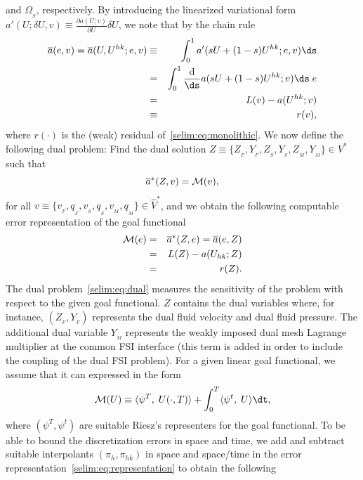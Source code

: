 and $\Omega_{_{S}}$, respectively. By introducing the linearized
variational form $a'(U; \delta U,v ) \equiv \frac{\partial
  a(U;v)}{\partial U}\delta U$, we note that by the chain rule
\begin{eqnarray}
\overline{a}(e, v) = \overline{a}(U,U^{hk};e, v) &\equiv& \int_0^1 a'(sU + (1-s)U^{hk}; e,
v) \ds \\ &=& \int_0^1 \frac{\textrm{d}}{\ds} a (sU + (1-s)U^{hk}; v)
\ds \;e\\ &=& L(v) - a(U^{hk};v) \\ &\equiv&  r(v),
\end{eqnarray}
where $r(\cdot)$ is the (weak) residual of~\ref{selim:eq:monolithic}.
We now define the following dual problem: Find the dual solution
$Z\equiv \{ Z_{_{F}}, Y_{_{F}}, Z_{_{S}}, Y_{_{S}}, Z_{_{M}},
Y_{_{M}}\}\in V^*$ such that
\begin{equation}
  \label{selim:eq:dual}
  \overline{a}^{*}(Z, v) = \mathcal{M}(v),
\end{equation}
for all $v\equiv \{ v_{_{F}}, q_{_{F}}, v_{_{S}}, q_{_{S}}, v_{_{M}}, q_{_{M}}
\}\in\hat{V}^*$, and we obtain the following computable error
representation of the goal functional
\begin{eqnarray}
\label{selim:eq:representation}
\nonumber
\mathcal{M}(e) &=& \overline{a}^{*}(Z ,e) = \overline{a}(e, Z)\\ &=& L(Z) - a(
U_{hk}; Z)\\
\nonumber
&=& r(Z).
\end{eqnarray}
The dual problem~\eqref{selim:eq:dual} measures the sensitivity of the
problem with respect to the given goal functional.  $Z$ contains the
dual variables where, for instance, $(Z_{_{F}}, Y_{_{F}})$ represents
the dual fluid velocity and dual fluid pressure.  The additional dual
variable $Y_{_{M}}$ represents the weakly imposed dual mesh Lagrange
multiplier at the common FSI interface (this term is added in order to
include the coupling of the dual FSI problem). For a given linear
goal functional, we assume that it can expressed in the form
\begin{equation}
\M(U)  \equiv \langle \psi^T,\;  U(\cdot, T) \rangle +
\int_0^T \langle \psi^t,\; U \rangle \dt,
\end{equation}
where $(\psi^T, \psi^t)$ are suitable Riesz's representers for the
goal functional. To be able to bound the discretization errors in
space and time, we add and subtract suitable interpolants $(\pi_h,
\pi_{hk})$ in space and space/time in the error
representation~\eqref{selim:eq:representation} to obtain the following
